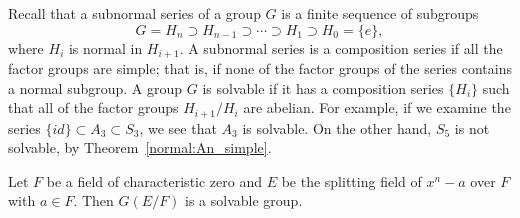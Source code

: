  
 
Recall that a subnormal series of a group $G$ is a finite sequence
of subgroups
\[
G = H_n \supset H_{n-1} \supset \cdots \supset H_1 \supset
H_0 = \{ e \},
\]
where $H_i$ is normal in $H_{i+1}$. A subnormal series is a composition 
series if all the factor groups are simple; that is, if none of the factor 
groups of the series contains a normal subgroup. A group $G$ is solvable 
if it has a composition series $\{ H_i \}$ such that all of the factor 
groups $H_{i+1} /H_i$ are abelian.  For example, if we examine the
series $\{ id \} \subset A_3 \subset S_3$, we see that $A_3$ is
solvable.  On the other hand, $S_5$ is not solvable, by Theorem~\ref{normal:An_simple}.
 
 

 
\begin{lemma}\label{galois:xn-a_solvable_lemma}
Let $F$ be a field of characteristic zero and $E$ be the splitting
field of $x^n - a$ over $F$ with $a \in F$. Then $G(E/F)$ is a
solvable group.  
\end{lemma}
 
